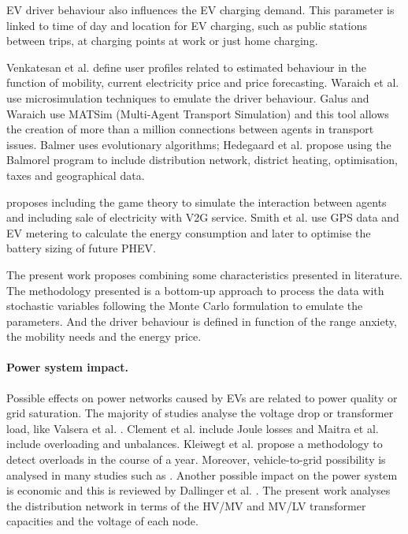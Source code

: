 \documentclass[a4paper,11pt,twoside,openright]{report}
\begin{document}
EV driver behaviour also influences the EV charging demand. This parameter is linked to time of day and location for EV charging, such as public stations between trips, at charging points at work or just home charging.

Venkatesan et al. \cite{Venkatesan2012} define user profiles related to estimated behaviour in the function of mobility, current electricity price and price forecasting. Waraich et al. \cite{Waraich_ETH} use microsimulation techniques to emulate the driver behaviour. Galus and Waraich \cite{Waraich_v2,Galus2009} use MATSim (Multi-Agent Transport Simulation) and this tool allows the creation of more than a million connections between agents in transport issues. Balmer \cite{BalmerMATSim} uses evolutionary algorithms; Hedegaard et al. \cite{Hedegaard66} propose using the Balmorel program to include distribution network, district heating, optimisation, taxes and geographical data.

\cite{Mohsenian2010} proposes including the game theory to simulate the interaction between agents and including sale of electricity with V2G service. Smith et al. \cite{Smith2011} use GPS data and EV metering to calculate the energy consumption and later to optimise the battery sizing of future PHEV.

The present work proposes combining some characteristics presented in literature. The methodology presented is a bottom-up approach to process the data with stochastic variables following the Monte Carlo formulation to emulate the parameters. And the driver behaviour is defined in function of the range anxiety, the mobility needs and the energy price.

\paragraph{Power system impact.}
Possible effects on power networks caused by EVs are related to power quality or grid saturation. The majority of studies analyse the voltage drop or transformer load, like Valsera et al. \cite{Valsera2011,Valsera2012}. Clement et al. \cite{Clement2010} include Joule losses and Maitra et al. \cite{MaitraCIRED2009} include overloading and unbalances. Kleiwegt et al. \cite{Kleiwegt2012} propose a methodology to detect overloads in the course of a year. Moreover, vehicle-to-grid possibility is analysed in many studies such as \cite{Kempton2005, Tomic2007, Zakariazadeh2014}. Another possible impact on the power system is economic and this is reviewed by Dallinger et al. \cite{Dallinger2012}. The present work analyses the distribution network in terms of the HV/MV and MV/LV transformer capacities and the voltage of each node.
\end{document}
